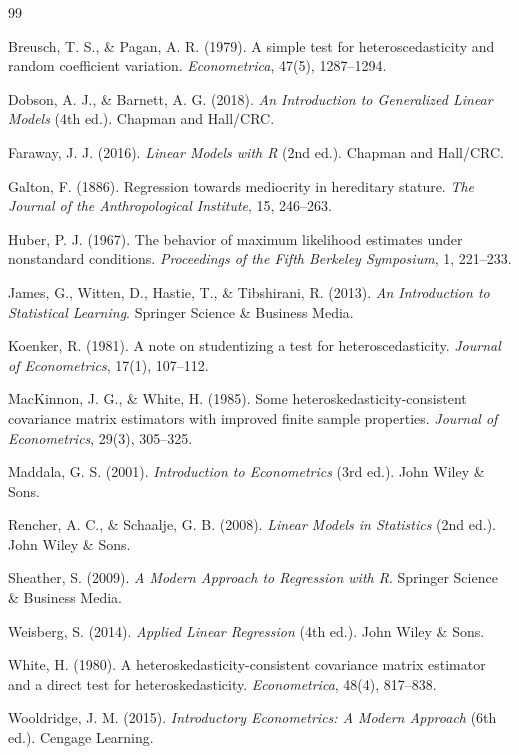 \documentclass[12pt, a4paper]{article}
\begin{document}
	\newpage
	\begin{thebibliography}{99}
		
		Breusch, T. S., \& Pagan, A. R. (1979). 
		A simple test for heteroscedasticity and random coefficient variation. 
		\textit{Econometrica}, 47(5), 1287--1294.
		
		Dobson, A. J., \& Barnett, A. G. (2018). 
		\textit{An Introduction to Generalized Linear Models} (4th ed.). 
		Chapman and Hall/CRC.
		
		Faraway, J. J. (2016). 
		\textit{Linear Models with R} (2nd ed.). 
		Chapman and Hall/CRC.
		
		Galton, F. (1886). 
		Regression towards mediocrity in hereditary stature. 
		\textit{The Journal of the Anthropological Institute}, 15, 246--263.
		
		Huber, P. J. (1967). 
		The behavior of maximum likelihood estimates under nonstandard conditions. 
		\textit{Proceedings of the Fifth Berkeley Symposium}, 1, 221--233.
		
		James, G., Witten, D., Hastie, T., \& Tibshirani, R. (2013). 
		\textit{An Introduction to Statistical Learning}. 
		Springer Science \& Business Media.
		
		Koenker, R. (1981). 
		A note on studentizing a test for heteroscedasticity. 
		\textit{Journal of Econometrics}, 17(1), 107--112.
		
		MacKinnon, J. G., \& White, H. (1985). 
		Some heteroskedasticity-consistent covariance matrix estimators with improved finite sample properties. 
		\textit{Journal of Econometrics}, 29(3), 305--325.
		
		Maddala, G. S. (2001). 
		\textit{Introduction to Econometrics} (3rd ed.). 
		John Wiley \& Sons.
		
		Rencher, A. C., \& Schaalje, G. B. (2008). 
		\textit{Linear Models in Statistics} (2nd ed.). 
		John Wiley \& Sons.
		
		Sheather, S. (2009). 
		\textit{A Modern Approach to Regression with R}. 
		Springer Science \& Business Media.
		
		Weisberg, S. (2014). 
		\textit{Applied Linear Regression} (4th ed.). 
		John Wiley \& Sons.
		
		White, H. (1980). 
		A heteroskedasticity-consistent covariance matrix estimator and a direct test for heteroskedasticity. 
		\textit{Econometrica}, 48(4), 817--838.
		
		Wooldridge, J. M. (2015). 
		\textit{Introductory Econometrics: A Modern Approach} (6th ed.). 
		Cengage Learning.
		
	\end{thebibliography}
	
\end{document}

